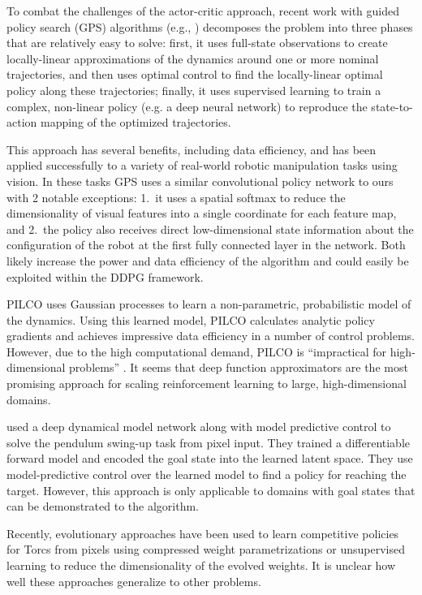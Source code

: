 \documentclass{article} \usepackage{iclr2016_conference,times}
\begin{document}
To combat the challenges of the actor-critic approach, recent work
with guided policy search (GPS) algorithms (e.g.,
\citep{levine2015end}) decomposes the problem into three phases that are
relatively easy to solve: first, it uses full-state observations to
create locally-linear approximations of the dynamics around one or
more nominal trajectories, and then uses optimal control to find the
locally-linear optimal policy along these trajectories; finally, it uses
supervised learning to train a complex, non-linear policy (e.g. a deep
neural network) to reproduce the state-to-action mapping of the optimized
trajectories.

This approach has several benefits, including data efficiency, and has been
applied successfully to a variety of real-world
robotic manipulation tasks using vision.
In these tasks GPS uses a similar convolutional policy network to ours with
2 notable exceptions: 1.\ it uses a spatial softmax to reduce the
dimensionality of visual features into a single  coordinate for
each feature map, and
2.\ the policy also receives direct low-dimensional state information
about the configuration of the robot at the first fully connected
layer in the network.  Both likely increase the power and data
efficiency of the algorithm and could easily be exploited within the DDPG
framework.

PILCO \citep{deisenroth2011pilco} uses Gaussian processes to learn a
non-parametric, probabilistic model of the dynamics. Using this learned model,
PILCO calculates analytic policy gradients and achieves impressive
data efficiency in a number of control problems. However, due to the
high computational demand, PILCO is
``impractical for high-dimensional problems''
\citep{wahlstrom2015pixels}. It seems that deep function approximators
are the most promising approach for scaling reinforcement learning to
large, high-dimensional domains.

\citet{wahlstrom2015pixels}
used a deep dynamical model network
along with model predictive control to solve the pendulum
swing-up task from pixel input.  They trained a differentiable forward model
and encoded the goal state into the learned latent space.
They use model-predictive control over the learned model
to find a policy for reaching the target.
However, this approach is only applicable to domains with goal states that
can be demonstrated to the algorithm.

Recently, evolutionary approaches have been used to learn
competitive policies for Torcs from pixels
using compressed weight parametrizations \citep{koutnik2014evolving} or
unsupervised learning \citep{koutnik2014online}
to reduce the dimensionality
of the evolved weights. It is unclear how well these
approaches generalize to other problems.
\end{document}

